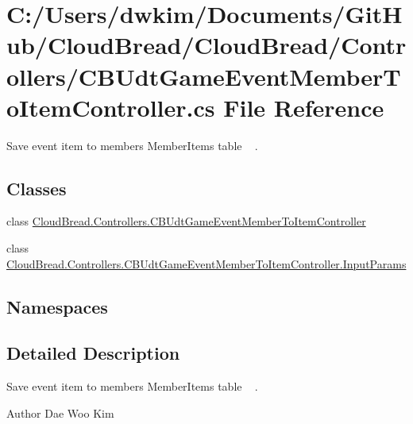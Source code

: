 \hypertarget{a00229}{}\section{C\+:/\+Users/dwkim/\+Documents/\+Git\+Hub/\+Cloud\+Bread/\+Cloud\+Bread/\+Controllers/\+C\+B\+Udt\+Game\+Event\+Member\+To\+Item\+Controller.cs File Reference}
\label{a00229}


Save event item to member\textquotesingle{}s Member\+Items table ~\newline
.  


\subsection*{Classes}
\begin{DoxyCompactItemize}
\item 
class \hyperlink{a00058}{Cloud\+Bread.\+Controllers.\+C\+B\+Udt\+Game\+Event\+Member\+To\+Item\+Controller}
\item 
class \hyperlink{a00108}{Cloud\+Bread.\+Controllers.\+C\+B\+Udt\+Game\+Event\+Member\+To\+Item\+Controller.\+Input\+Params}
\end{DoxyCompactItemize}
\subsection*{Namespaces}
\begin{DoxyCompactItemize}
\end{DoxyCompactItemize}


\subsection{Detailed Description}
Save event item to member\textquotesingle{}s Member\+Items table ~\newline
. 

\begin{DoxyAuthor}{Author}
Dae Woo Kim 
\end{DoxyAuthor}

